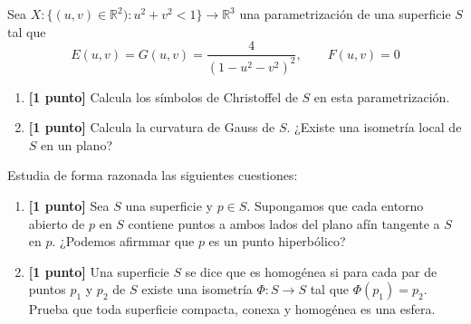 \documentclass[12pt]{article}
\begin{document}
    \begin{ejercicio}
        Sea $X:\{(u,v)\in \mathbb{R}^2) : u^2+v^2 < 1\}\to \mathbb{R}^3$ una parametrización de una superficie $S$ tal que
        \begin{equation*}
            E(u,v) = G(u,v) = \frac{4}{{(1-u^2-v^2)}^{2}}, \qquad F(u,v) = 0
        \end{equation*}
        \begin{enumerate}[label=\alph*)]
            \item \textbf{[1 punto]} Calcula los símbolos de Christoffel de $S$ en esta parametrización.
            \item \textbf{[1 punto]} Calcula la curvatura de Gauss de $S$. ¿Existe una isometría local de $S$ en un plano?
        \end{enumerate}
    \end{ejercicio}

    \begin{ejercicio}
        Estudia de forma razonada las siguientes cuestiones:
        \begin{enumerate}[label=\alph*)]
            \item \textbf{[1 punto]} Sea $S$ una superficie y $p\in S$. Supongamos que cada entorno abierto de $p$ en $S$ contiene puntos a ambos lados del plano afín tangente a $S$ en $p.$ ¿Podemos afirmmar que $p$ es un punto hiperbólico?
            \item \textbf{[1 punto]} Una superficie $S$ se dice que es homogénea si para cada par de puntos $p_1$ y $p_2$ de $S$ existe una isometría $\Phi:S\to S$ tal que $\Phi(p_1) = p_2$. Prueba que toda superficie compacta, conexa y homogénea es una esfera.
        \end{enumerate}
    \end{ejercicio}
\end{document}
